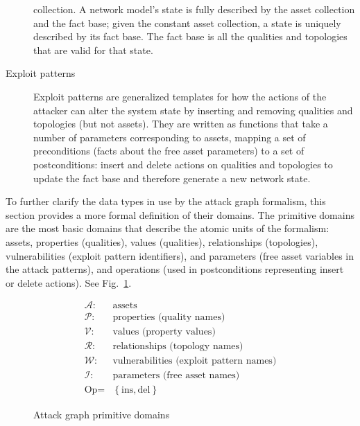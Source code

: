 \begin{description}
		collection. A network model's state is fully described by the asset collection and the fact base;
		given the constant asset collection, a state is uniquely described by its fact base. The fact
		base is all the qualities and topologies that are valid for that state.
	\item[Exploit patterns] Exploit patterns are generalized templates for how the actions of the attacker
		can alter the system state by inserting and removing qualities and topologies (but not assets).
		They are written as functions that take a number of parameters corresponding to assets, mapping
		a set of preconditions (facts about the free asset parameters) to a set of postconditions:
		insert and delete actions on qualities and topologies to update the fact base and therefore
		generate a new network state.
\end{description}
To further clarify the data types in use by the attack graph formalism,
this section provides a more formal definition of their domains.
The primitive domains are the most basic 
domains that describe the atomic units of
the formalism: assets, properties (qualities), values (qualities), relationships (topologies),
vulnerabilities (exploit pattern identifiers), and parameters (free asset variables in the attack
patterns), and operations (used in postconditions representing insert or delete actions).
See Fig.~\ref{fig:primitivedomains}.

\begin{figure}
\begin{align*}
    \mathcal{A} :& \text{assets} \\
    \mathcal{P} :& \text{properties (quality names)} \\
    \mathcal{V} :& \text{values (property values)} \\
    \mathcal{R} :& \text{relationships (topology names)} \\
    \mathcal{W} :& \text{vulnerabilities (exploit pattern names)} \\
    \mathcal{I} :& \text{parameters (free asset names)} \\
    \text{Op} =& \left\{\text{ins}, \text{del} \right\}
\end{align*}
\caption{Attack graph primitive domains}
\label{fig:primitivedomains}
\end{figure}

